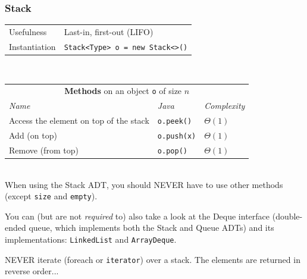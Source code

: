 \documentclass[8pt,aspectratio=169]{beamer}
\begin{document}
\begin{frame}
\frametitle{Stack}
\centering
\begin{tabular}{ll}
	Usefulness & Last-in, first-out (LIFO)\\
	Instantiation & \texttt{Stack<Type> o = new Stack<>()}
\end{tabular}\\
\vspace{0.5cm}
\centering
\begin{tabular}{lll}
	\multicolumn{3}{c}{\textbf{Methods} on an object \texttt{o} of size $n$} \\
	\textit{Name} & \textit{Java} & \textit{Complexity} \\
	Access the element on top of the stack & \texttt{o.peek()} & $\Theta(1)$\\
	Add (on top) & \texttt{o.push(x)} & $\Theta(1)$\\
	Remove (from top) & \texttt{o.pop()} & $\Theta(1)$\\
\end{tabular}\\
\vspace{0.5cm}
\color{blue} When using the Stack ADT, you should NEVER have to use other methods (except \texttt{size} and \texttt{empty}).

\color{blue} You can (but are not \textit{required} to) also take a look at the Deque interface (double-ended queue, which implements both the Stack and Queue ADTs) and its implementations: \texttt{LinkedList} and \texttt{ArrayDeque}.

\color{red} NEVER iterate (foreach or \texttt{iterator}) over a stack. The elements are returned in reverse order...

\end{frame}
\end{document}
